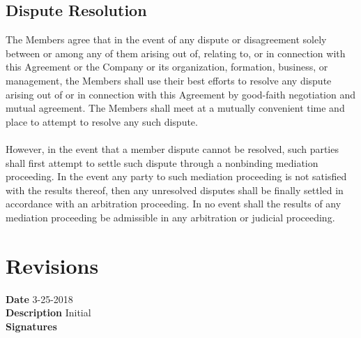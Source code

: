 \documentclass[11pt]{article}
\begin{document}
\subsection{Dispute Resolution}
The Members agree that in the event of any dispute or disagreement solely between or among any of them arising out of, relating to, or in connection with this Agreement or the Company or its organization, formation, business, or management, the Members shall use their best efforts to resolve any dispute arising out of or in connection with this Agreement by good-faith negotiation and mutual agreement. The Members shall meet at a mutually convenient time and place to attempt to resolve any such dispute.\\\\
However, in the event that a member dispute cannot be resolved, such parties shall first attempt to settle such dispute through a nonbinding mediation proceeding. In the event any party to such mediation proceeding is not satisfied with the results thereof, then any unresolved disputes shall be finally settled in accordance with an arbitration proceeding. In no event shall the results of any mediation proceeding be admissible in any arbitration or judicial proceeding.


\section{Revisions}
\label{sec:revisions}

\begin{minipage}{\textwidth}
\textbf{Date} 3-25-2018 \\
\textbf{Description} Initial \\
\textbf{Signatures} \\\\
\end{minipage}

\vspace*{\fill}

\begin{flushright}

\pdfcreationdate
\end{flushright}
\end{document}
